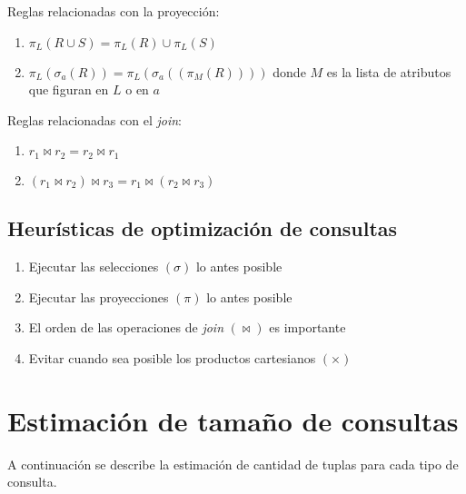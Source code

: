\documentclass[a4paper, twoside]{article}
\begin{document}
Reglas relacionadas con la proyección:
\begin{enumerate}
	\item $\pi_{L}(R\cup S)=\pi_{L}(R)\cup\pi_{L}(S)$
	\item $\pi_{L}\left(\sigma_{a}(R)\right)=\pi_{L}\left(\sigma_{a}\left(\left(\pi_{M}(R)\right)\right)\right)$ donde $M$ es la lista de atributos que figuran en $L$ o en $a$
\end{enumerate}

Reglas relacionadas con el \emph{join}:
\begin{enumerate}
	\item $r_{1}\bowtie r_{2}=r_{2}\bowtie r_{1}$
	\item $\left(r_{1}\bowtie r_{2}\right)\bowtie r_{3}=r_{1}\bowtie\left(r_{2}\bowtie r_{3}\right)$
\end{enumerate}

\subsection{Heurísticas de optimización de consultas}
\begin{enumerate}
	\item Ejecutar las selecciones $(\sigma)$ lo antes posible 
	\item Ejecutar las proyecciones $(\pi)$ lo antes posible
	\item El orden de las operaciones de \emph{join} $(\bowtie)$ es importante
	\item Evitar cuando sea posible los productos cartesianos $(\times)$
\end{enumerate}

\section{Estimación de tamaño de consultas}
A continuación se describe la estimación de cantidad de tuplas para cada tipo de consulta. 
\end{document}
